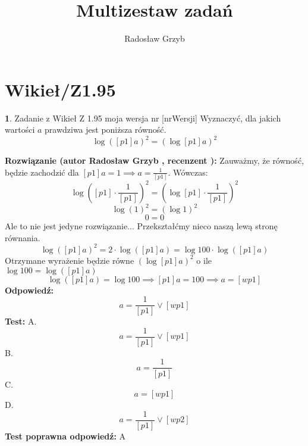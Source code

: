 \documentclass[12pt, a4paper]{article}
\title{Multizestaw zadań}
\author{Radosław Grzyb}
\date{}
\theoremstyle{definition} %
\newtheorem{zad}{}
\newcommand{\kategoria}[1]{\section{#1}} %
\newcommand{\zadStart}[1]{\begin{zad}#1\newline} %
\newcommand{\zadStop}{\end{zad}}   %
\newcommand{\rozwStart}[2]{\noindent \textbf{Rozwiązanie (autor #1 , recenzent #2): }\newline} %
\newcommand{\rozwStop}{\newline}                                            %
\newcommand{\odpStart}{\noindent \textbf{Odpowiedź:}\newline}    %
\newcommand{\odpStop}{\newline}                                             %
\newcommand{\testStart}{\noindent \textbf{Test:}\newline} %
\newcommand{\testStop}{\newline} %
\newcommand{\kluczStart}{\noindent \textbf{Test poprawna odpowiedź:}\newline} %
\newcommand{\kluczStop}{\newline} %
\begin{document}
\maketitle
\kategoria{Wikieł/Z1.95}
\zadStart{Zadanie z Wikieł Z 1.95 moja wersja nr [nrWersji]}
Wyznaczyć, dla jakich wartości $a$ prawdziwa jest poniższa równość.
$$\log([p1]a)^2=(\log[p1]a)^2$$
\zadStop
\rozwStart{Radosław Grzyb}{}
Zauważmy, że równość, będzie zachodzić dla $[p1]a=1 \implies a=\frac{1}{[p1]}$. Wówczas:
$$\log([p1]\cdot\frac{1}{[p1]})^2=(\log[p1]\cdot\frac{1}{[p1]})^2$$
$$\log(1)^2=(\log1)^2$$
$$0=0$$
Ale to nie jest jedyne rozwiązanie... Przekształćmy nieco naszą lewą stronę równania.
$$\log([p1]a)^2=2\cdot\log([p1]a)=\log100\cdot \log([p1]a)$$
Otrzymane wyrażenie będzie równe $(\log[p1]a)^2$ o ile $\log100=\log([p1]a)$
$$\log([p1]a)=\log100\implies[p1]a=100\implies a=[wp1]$$
\rozwStop
\odpStart
$$a=\frac{1}{[p1]}\lor[wp1]$$
\odpStop
\testStart
A.$$a=\frac{1}{[p1]}\lor[wp1]$$
B.$$a=\frac{1}{[p1]}$$
C.$$a=[wp1]$$
D.$$a=\frac{1}{[p1]}\lor[wp2]$$
\testStop
\kluczStart
A
\kluczStop
\end{document}
